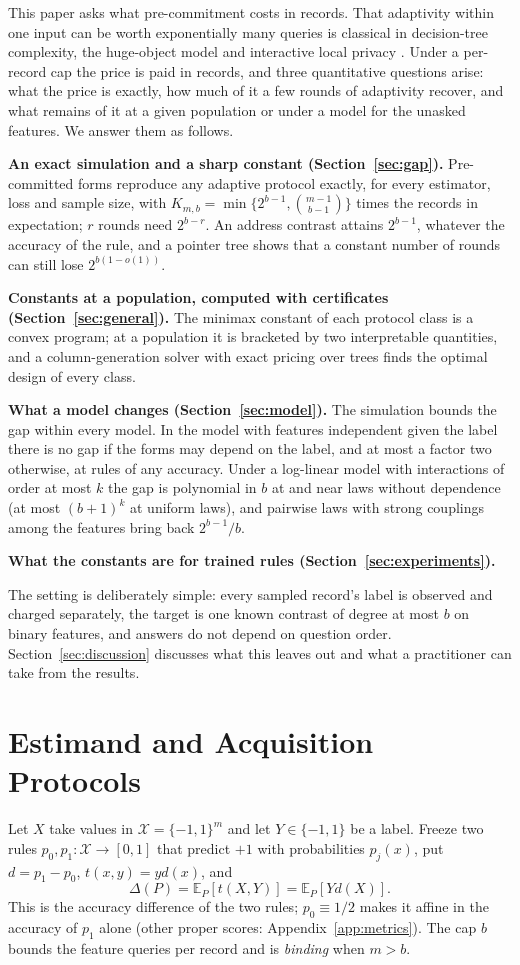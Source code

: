 \documentclass{article}
\newcommand{\E}{\mathbb{E}}
\newcommand{\X}{\mathcal X}
\begin{document}
This paper asks what pre-commitment costs in records. That adaptivity within one input can be worth exponentially many queries is classical in decision-tree complexity, the huge-object model and interactive local privacy \citep{goldreich2022,adar2024,joseph2019}. Under a per-record cap the price is paid in records, and three quantitative questions arise: what the price is exactly, how much of it a few rounds of adaptivity recover, and what remains of it at a given population or under a model for the unasked features. We answer them as follows.

\textbf{An exact simulation and a sharp constant (Section~\ref{sec:gap}).} Pre-committed forms reproduce any adaptive protocol exactly, for every estimator, loss and sample size, with $K_{m,b}=\min\{2^{b-1},\binom{m-1}{b-1}\}$ times the records in expectation; $r$ rounds need $2^{b-r}$. An address contrast attains $2^{b-1}$, whatever the accuracy of the rule, and a pointer tree shows that a constant number of rounds can still lose $2^{b(1-o(1))}$.

\textbf{Constants at a population, computed with certificates (Section~\ref{sec:general}).} The minimax constant of each protocol class is a convex program; at a population it is bracketed by two interpretable quantities, and a column-generation solver with exact pricing over trees finds the optimal design of every class.

\textbf{What a model changes (Section~\ref{sec:model}).} The simulation bounds the gap within every model. In the model with features independent given the label there is no gap if the forms may depend on the label, and at most a factor two otherwise, at rules of any accuracy. Under a log-linear model with interactions of order at most $k$ the gap is polynomial in $b$ at and near laws without dependence (at most $(b+1)^k$ at uniform laws), and pairwise laws with strong couplings among the features bring back $2^{b-1}/b$.

\textbf{What the constants are for trained rules (Section~\ref{sec:experiments}).} \nContribData

The setting is deliberately simple: every sampled record's label is observed and charged separately, the target is one known contrast of degree at most $b$ on binary features, and answers do not depend on question order. Section~\ref{sec:discussion} discusses what this leaves out and what a practitioner can take from the results.

\section{Estimand and Acquisition Protocols}\label{sec:setup}
Let $X$ take values in $\X=\{-1,1\}^m$ and let $Y\in\{-1,1\}$ be a label. Freeze two rules $p_0,p_1:\X\to[0,1]$ that predict $+1$ with probabilities $p_j(x)$, put $d=p_1-p_0$, $t(x,y)=yd(x)$, and
\begin{equation}
 \Delta(P)=\E_P[t(X,Y)]=\E_P[Yd(X)].\label{eq:gain}
\end{equation}
This is the accuracy difference of the two rules; $p_0\equiv1/2$ makes it affine in the accuracy of $p_1$ alone (other proper scores: Appendix~\ref{app:metrics}). The cap $b$ bounds the feature queries per record and is \emph{binding} when $m>b$.
\end{document}
